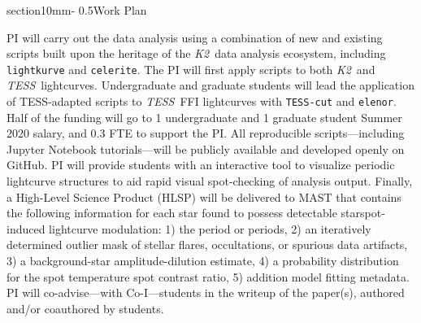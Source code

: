 \documentclass[letterpaper,12pt]{article}
\makeatletter
\renewcommand{\section}{\@startsection%
{section}{1}{0mm}{-\baselineskip}%
{0.5\baselineskip}{\normalfont\Large\bfseries}}%
\newcommand{\tess}{{\it TESS}}
\newcommand{\ktwo}{{\it K2}}
\makeatother
\begin{document}
\section{Work Plan}

PI will carry out the data analysis using a combination of new and existing scripts built upon the heritage of the \ktwo\ data analysis ecosystem, including \texttt{lightkurve} and \texttt{celerite}.  The PI will first apply scripts to both \ktwo\ and \tess\ lightcurves.  Undergraduate and graduate students will lead the application of TESS-adapted scripts to \tess\ FFI lightcurves with \texttt{TESS-cut} and \texttt{elenor}.  Half of the funding will go to 1 undergraduate and 1 graduate student Summer 2020 salary, and 0.3 FTE to support the PI.  All reproducible scripts---including Jupyter Notebook tutorials---will be publicly available and developed openly on GitHub.
PI will provide students with an interactive tool to visualize periodic lightcurve structures to aid rapid visual spot-checking of analysis output.  Finally, a High-Level Science Product (HLSP) will be delivered to MAST that contains the following information for each star found to possess detectable starspot-induced lightcurve modulation: 1) the period or periods, 2) an iteratively determined outlier mask of stellar flares, occultations, or spurious data artifacts, 3) a background-star amplitude-dilution estimate, 4) a probability distribution for the spot temperature spot contrast ratio, 5) addition model fitting metadata.  PI will co-advise---with Co-I---students in the writeup of the paper(s), authored and/or coauthored by students.


\newpage


\end{document}
